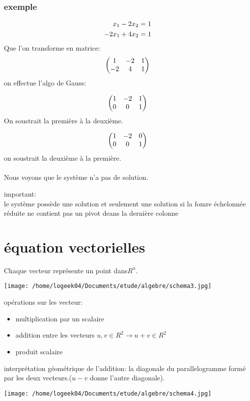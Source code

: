 \documentclass[a4paper,10pt]{article}
\begin{document}
\subsubsection{exemple}
\begin{eqnarray}
 x_1-2x_2=1\cr
 -2x_1+4x_2=1
\end{eqnarray}
Que l'on transforme en matrice:
\[
\begin{pmatrix}
 1&-2&1\cr
 -2&4&1
\end{pmatrix}
\]
on effectue l'algo de Gauss:

\[
\begin{pmatrix}
 1&-2&1\cr
 0&0&1
\end{pmatrix}
\]
On soustrait la première à la deuxième.

 \[
\begin{pmatrix}
 1&-2&0\cr
 0&0&1
\end{pmatrix}
\]
on soustrait la deuxième à la première.
\paragraph{}
Nous voyons que le système n'a pas de solution.

\begin{description}
 \item important:\\{le système possède une solution et seulement une solution si la fomre échelonnée réduite ne contient pas un pivot deans la dernière colonne}
\end{description}

\section{équation vectorielles}
Chaque vecteur représente un point dans$ R^n$.

\texttt{[image: /home/logeek04/Documents/etude/algebre/schema3.jpg]}


opérations sur les vecteur:
\begin{itemize}
 \item multiplication par un scalaire
 \item addition entre les vecteurs $ u,v\in R^2\rightarrow u+v\in R^2 $
 \item produit scalaire
\end{itemize}
interprétation géométrique de l'addition: la diagonale du parallelogramme formé par les deux vecteurs.($u-v$ donne l'autre diagonale).

\texttt{[image: /home/logeek04/Documents/etude/algebre/schema4.jpg]}
\end{document}
